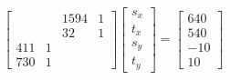 \documentclass[a4paper]{article}
\begin{document}
\begin{equation}
	\begin{bmatrix}
		 & & 1594 & 1\\
		 & & 32 & 1\\
		 411 & 1 & &\\
		 730 & 1 & &
	\end{bmatrix}
	\begin{bmatrix}
		s_x\\t_x\\s_y\\t_y
	\end{bmatrix}
	=
	\begin{bmatrix}
		640\\540\\-10\\10
	\end{bmatrix}
\end{equation}
\begin{comment}
	>> A = sym([0 0 1594 1;0 0 32 1; 411 1 0 0; 730 1 0 0])
	 
	A =
	 
	[   0, 0, 1594, 1]
	[   0, 0,   32, 1]
	[ 411, 1,    0, 0]
	[ 730, 1,    0, 0]
	 
	>> B = inv(A)
	 
	B =
	 
	[       0,       0,  -1/319,    1/319]
	[       0,       0, 730/319, -411/319]
	[  1/1562, -1/1562,       0,        0]
	[ -16/781, 797/781,       0,        0]
	 
	>> B*[640;540;-10;10]
	 
	ans =
	 
	     20/319
	 -11410/319
	     50/781
	 420140/781
\end{comment}
\end{document}
